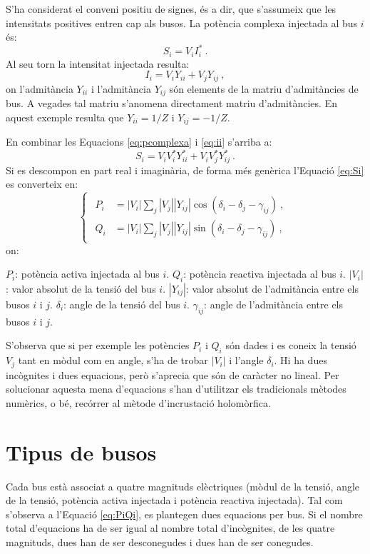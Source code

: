 S'ha considerat el conveni positiu de signes, és a dir, que s'assumeix que les intensitats positives entren cap als busos. La potència complexa injectada al bus $i$ és: %
\begin{equation}
S_i = V_iI^*_i\ .
\label{eq:pcomplexa}
\end{equation}
Al seu torn la intensitat injectada resulta:
\begin{equation}
I_i=V_iY_{ii} + V_jY_{ij}\ ,
\label{eq:ii}
\end{equation}
on l'admitància $Y_{ii}$ i l'admitància $Y_{ij}$ són elements de la matriu d'admitàncies de bus. A vegades tal matriu s'anomena directament matriu d'admitàncies. En aquest exemple resulta que $Y_{ii}=1/Z$ i $Y_{ij}=-1/Z$.

En combinar les Equacions \ref{eq:pcomplexa} i \ref{eq:ii} s'arriba a:
\begin{equation}
S_i=V_iV^*_iY^*_{ii} + V_iV^*_{j}Y^*_{ij}\ .
\label{eq:Si}
\end{equation}
Si es descompon en part real i imaginària, de forma més genèrica l'Equació \ref{eq:Si} es converteix en:
\begin{equation}
\begin{cases}
    \begin{split}
    P_i&=|V_i|\sum_j|V_j||Y_{ij}|\cos({\delta_i - \delta_j - \gamma_{ij}})\ ,\\
    Q_i&=|V_i|\sum_j|V_j||Y_{ij}|\sin({\delta_i - \delta_j - \gamma_{ij}})\ ,
    \end{split}
\end{cases}
\label{eq:PiQi}
\end{equation}
on:

$P_i$: potència activa injectada al bus $i$.
\vs
$Q_i$: potència reactiva injectada al bus $i$.
\vs
$|V_i|$: valor absolut de la tensió del bus $i$.
\vs
$|Y_{ij}|$: valor absolut de l'admitància entre els busos $i$ i $j$.
\vs
$\delta_i$: angle de la tensió del bus $i$.
\vs
$\gamma_{ij}$: angle de l'admitància entre els busos $i$ i $j$.

S'observa que si per exemple les potències $P_i$ i $Q_i$ són dades i es coneix la tensió $V_j$ tant en mòdul com en angle, s'ha de trobar $|V_i|$ i l'angle $\delta_i$. Hi ha dues incògnites i dues equacions, però s'aprecia que són de caràcter no lineal. Per solucionar aquesta mena d'equacions s'han d'utilitzar els tradicionals mètodes numèrics, o bé, recórrer al mètode d'incrustació holomòrfica.

\section{Tipus de busos}
Cada bus està associat a quatre magnituds elèctriques (mòdul de la tensió, angle de la tensió, potència activa injectada i potència reactiva injectada). Tal com s'observa a l'Equació \ref{eq:PiQi}, es plantegen dues equacions per bus. Si el nombre total d'equacions ha de ser igual al nombre total d'incògnites, de les quatre magnituds, dues han de ser desconegudes i dues han de ser conegudes.

